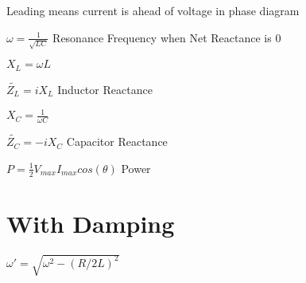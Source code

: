 \documentclass{article}
\begin{document}
\large {Leading means current is ahead of voltage in phase diagram}

\LARGE$\omega=\frac{1}{\sqrt{LC}}$
\large {Resonance Frequency when Net Reactance is 0}

\LARGE$X_L=\omega{L}$

\LARGE$\widetilde{Z_L}=iX_L$
\large {Inductor Reactance}

\LARGE$X_C=\frac{1}{\omega{C}}$

\LARGE$\widetilde{Z_C}=-iX_C$
\large {Capacitor Reactance}


\LARGE$P=\frac{1}{2}V_{max}I_{max}cos(\theta)$
\large {Power}

\section {With Damping}

\LARGE$\omega\prime=\sqrt{\omega^2-(R/2L)^2}$
\end{document}
